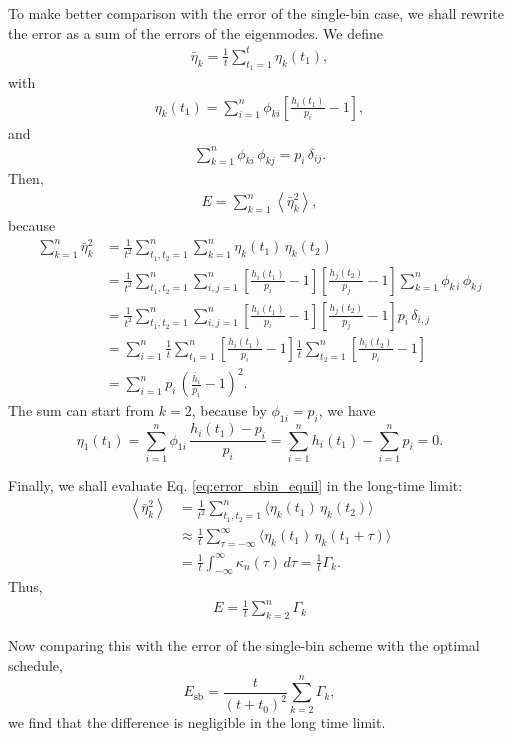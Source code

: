 \documentclass[12pt]{article}
\begin{document}
To make better comparison with
the error of the single-bin case,
we shall rewrite the error as
a sum of the errors of the eigenmodes.
We define
\begin{align}
\bar \eta_k
=
\frac{ 1 } { t }
\sum_{ t_1 = 1 } ^ t
  \eta_k( t_1 ),
\end{align}
%
with
\begin{align}
\eta_k( t_1 )
=
\sum_{ i = 1 }^ n
\phi_{k i} \left[
             \frac{ h_i(t_1) }
                  { p_i      }
             - 1
           \right],
\end{align}
and
\begin{align}
\sum_{ k = 1 }^n
  \phi_{k i} \, \phi_{k j}
  = p_i \, \delta_{i j}.
\end{align}
%
Then,
%
\begin{align}
E
=
\sum_{ k = 1 }^n
  \left\langle
    \bar \eta_k^2
  \right\rangle,
\label{eq:error_sbin_equil}
\end{align}
%
because
%
\begin{align*}
\sum_{ k = 1 }^n
  \bar \eta_k^2
&=
\frac{ 1 } { t^2 }
\sum_{ t_1, t_2 = 1 }^n
  \sum_{ k = 1 }^n
    \eta_k( t_1 ) \, \eta_k( t_2 )
\\
&=
\frac{ 1 } { t^2 }
\sum_{ t_1, t_2 = 1 }^n
  \sum_{ i, j = 1 }^n
    \left[
      \frac{ h_i(t_1) }
           { p_i      }
      - 1
    \right]
    \left[
      \frac{ h_j(t_2) }
           { p_j      }
      - 1
    \right]
    \sum_{ k = 1 }^n
      \phi_{k \, i} \, \phi_{k \, j}
\\
&=
\frac{ 1 } { t^2 }
\sum_{ t_1, t_2 = 1 }^n
  \sum_{ i, j = 1 }^n
    \left[
      \frac{ h_i(t_1) }
           { p_i      }
      - 1
    \right]
    \left[
      \frac{ h_j(t_2) }
           { p_j      }
      - 1
    \right]
    p_i \, \delta_{i, j}
\\
&=
\sum_{ i = 1 }^n
\frac{ 1 } { t }
\sum_{ t_1 = 1 }^n
    \left[
      \frac{ h_i(t_1) }
           { p_i      }
      - 1
    \right]
\frac{ 1 } { t }
\sum_{ t_2 = 1 }^n
    \left[
      \frac{ h_i(t_2) }
           { p_i      }
      - 1
    \right]
\\
&=
\sum_{ i = 1 }^n
  p_i \,
    \left(
      \frac{ \bar h_i }
           { p_i      }
      - 1
    \right)^2
.
\end{align*}
%
The sum can start from $k = 2$,
because by $\phi_{1i} = p_i$,
we have
$$
\eta_1(t_1)
=
\sum_{ i = 1 }^n
  \phi_{1i} \, \frac{ h_i(t_1) - p_i } { p_i }
=
\sum_{ i = 1 }^n h_i(t_1)
- \sum_{ i = 1 }^n p_i = 0.
$$

Finally, we shall evaluate Eq. \eqref{eq:error_sbin_equil}
in the long-time limit:
\begin{align*}
\left\langle
  \bar \eta_k^2
\right\rangle
&=
\frac{1}{t^2}
\sum_{ t_1, t_2 = 1 }^n
\langle \eta_k(t_1) \, \eta_k(t_2) \rangle
\\
&\approx
\frac{1}{t}
\sum_{ \tau = -\infty }^{ \infty }
\langle \eta_k(t_1) \, \eta_k(t_1 + \tau) \rangle
\\
&=
\frac{1 }{t}
\int_{-\infty}^\infty
\kappa_n(\tau) \, d\tau
=
\frac{1}{t}
\Gamma_k.
\end{align*}
%
Thus,
\begin{align}
E
=
\frac{ 1 } { t }
\sum_{ k = 2 }^n
\Gamma_k
\end{align}

Now comparing this with the error of the single-bin scheme
with the optimal schedule,
$$
E_{\mathrm{sb}}
=
\frac{    t    }
     { (t + t_0)^2 }
\sum_{ k = 2 }^n
  \Gamma_k,
$$
we find that the difference is negligible in the long time limit.
\end{document}
